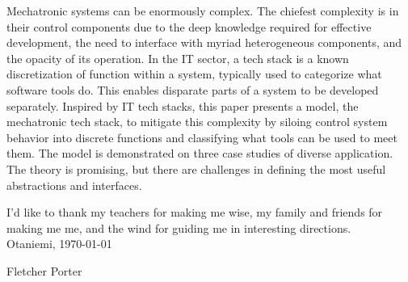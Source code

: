 \documentclass[english,12pt,a4paper,pdftex,eng,utf8]{aaltothesis}
\begin{document}

\begin{abstractpage}[english]
Mechatronic systems can be enormously complex. The chiefest complexity is in their control components due to the deep knowledge required for effective development, the need to interface with myriad heterogeneous components, and the opacity of its operation. In the IT sector, a tech stack is a known discretization of function within a system, typically used to categorize what software tools do. This enables disparate parts of a system to be developed separately. Inspired by IT tech stacks, this paper presents a model, the mechatronic tech stack, to mitigate this complexity by siloing control system behavior into discrete functions and classifying what tools can be used to meet them. The model is demonstrated on three case studies of diverse application. The theory is promising, but there are challenges in defining the most useful abstractions and interfaces.
\end{abstractpage}

\newpage

I'd like to thank my teachers for making me wise, my family and friends for making me me, and the wind for guiding me in interesting directions. \\

\vspace{5cm}
Otaniemi, \today

\vspace{5mm}
{\hfill Fletcher Porter \hspace{1cm}}

\newpage
\end{document}
